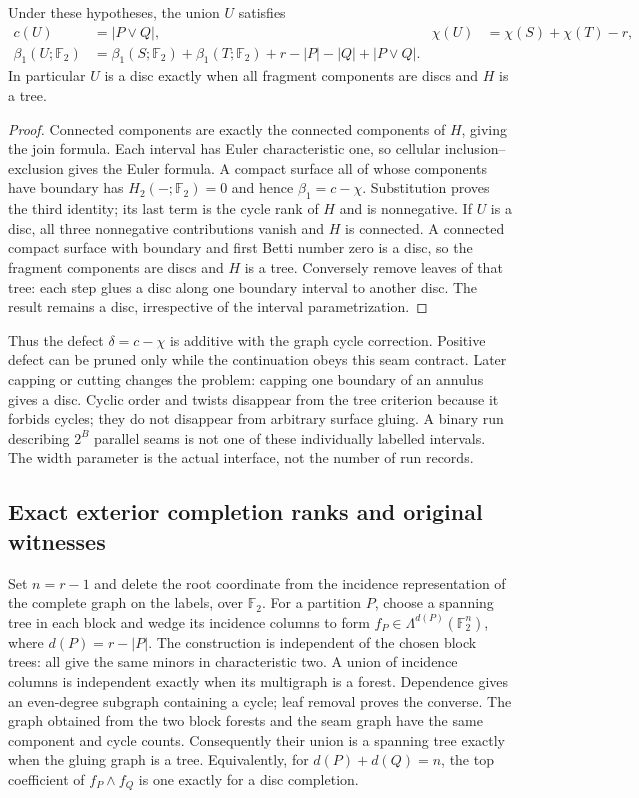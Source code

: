 \begin{proposition}
Under these hypotheses, the union $U$ satisfies
\begin{align*}
 c(U)&=|P\vee Q|, & \chi(U)&=\chi(S)+\chi(T)-r,\\
 \beta_1(U;\mathbb F_2)&=\beta_1(S;\mathbb F_2)+\beta_1(T;\mathbb F_2)
       +r-|P|-|Q|+|P\vee Q|.
\end{align*}
In particular $U$ is a disc exactly when all fragment components are discs
and $H$ is a tree.
\end{proposition}
\begin{proof}
Connected components are exactly the connected components of $H$, giving
the join formula. Each interval has Euler characteristic one, so cellular
inclusion--exclusion gives the Euler formula. A compact surface all of whose
components have boundary has $H_2(-;\mathbb F_2)=0$ and hence
$\beta_1=c-\chi$. Substitution proves the third identity; its last term is
the cycle rank of $H$ and is nonnegative. If $U$ is a disc, all three
nonnegative contributions vanish and $H$ is connected. A connected compact
surface with boundary and first Betti number zero is a disc, so the fragment
components are discs and $H$ is a tree. Conversely remove leaves of that
tree: each step glues a disc along one boundary interval to another disc.
The result remains a disc, irrespective of the interval parametrization.
\end{proof}

Thus the defect $\delta=c-\chi$ is additive with the graph cycle correction.
Positive defect can be pruned only while the continuation obeys this seam
contract. Later capping or cutting changes the problem: capping one boundary
of an annulus gives a disc. Cyclic order and twists disappear from the tree
criterion because it forbids cycles; they do not disappear from arbitrary
surface gluing. A binary run describing $2^B$ parallel seams is not one of
these individually labelled intervals. The width parameter is the actual
interface, not the number of run records.

\subsection{Exact exterior completion ranks and original witnesses}

Set $n=r-1$ and delete the root coordinate from the incidence representation
of the complete graph on the labels, over $\mathbb F_2$. For a partition $P$,
choose a spanning tree in each block and wedge its incidence columns to form
$f_P\in\Lambda^{d(P)}(\mathbb F_2^n)$, where $d(P)=r-|P|$.
The construction is independent of the chosen block trees: all give the
same minors in characteristic two. A union of incidence columns is
independent exactly when its multigraph is a forest. Dependence gives an
even-degree subgraph containing a cycle; leaf removal proves the converse.
The graph obtained from the two block forests and the seam graph have the
same component and cycle counts. Consequently their union is a spanning
tree exactly when the gluing graph is a tree. Equivalently, for
$d(P)+d(Q)=n$, the top coefficient of $f_P\wedge f_Q$ is one exactly for a
disc completion.

